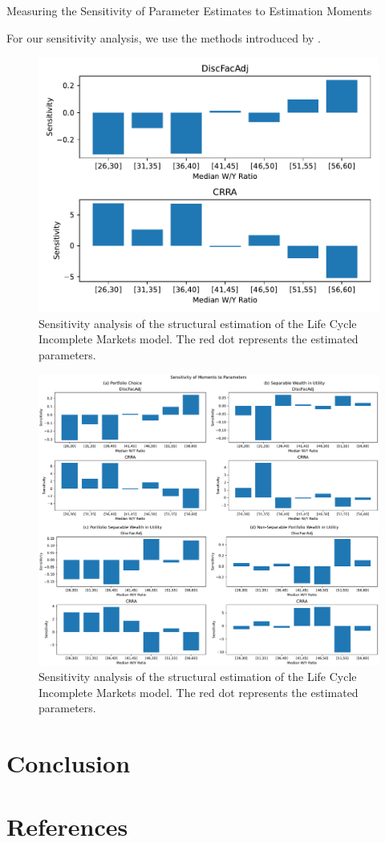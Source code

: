\documentclass{article}
\begin{document}
\cite{Andrews_2017} Measuring the Sensitivity of Parameter Estimates to Estimation Moments

For our sensitivity analysis, we use the methods introduced by \cite{Andrews_2017}.

\begin{figure}[!htbp]
\centering
\includegraphics[width=0.7\linewidth]{files/IndShockSensitivity-9046783d8c17a2fc3e39f5fb5ebcf6c7.pdf}
\caption{Sensitivity analysis of the structural estimation of the Life Cycle Incomplete Markets model. The red dot represents the estimated parameters.}
\label{fig:IndShockSensitivity}
\end{figure}

\begin{figure}[!htbp]
\centering
\includegraphics[width=0.7\linewidth]{files/AllSensitivity-0f14236654de527c752f26a13f644a4c.pdf}
\caption{Sensitivity analysis of the structural estimation of the Life Cycle Incomplete Markets model. The red dot represents the estimated parameters.}
\label{fig:AllSensitivity}
\end{figure}

\section{Conclusion}\label{Conclusion}

\section{References}\label{References}





\end{document}
